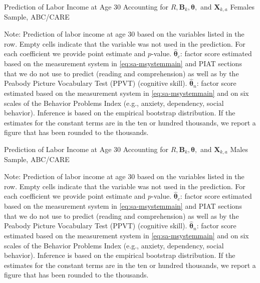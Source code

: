 \begin{table}
\begin{threeparttable}
\caption{Prediction of Labor Income at Age 30 Accounting for $R, \bm{B}_k, \bm{\theta},$ and $\bm{X}_{k,a}$ Females Sample, ABC/CARE}
\label{table:end2}
\centering
\scriptsize

\begin{tablenotes}
\footnotesize
\item Note: Prediction of labor income at age 30 based on the variables listed in the row. Empty cells indicate that the variable was not used in the prediction. For each coefficient we provide point estimate and $p$-value. $\hat{\bm{\theta}}_{c}$: factor score estimated based on the measurement system in \eqref{eq:sa-msystemmain} and PIAT sections that we do not use to predict (reading and comprehension) as well as by the Peabody Picture Vocabulary Test (PPVT) (cognitive skill). $\hat{\bm{\theta}}_{n}$: factor score estimated based on the measurement system in \eqref{eq:sa-msystemmain} and on six scales of the Behavior Problems Index (e.g., anxiety, dependency, social behavior). Inference is based on the empirical bootstrap distribution. If the estimates for the constant terms are in the ten or hundred thousands, we report a figure that has been rounded to the thousands.
\end{tablenotes}
\end{threeparttable}
\end{table}

\begin{table}
\begin{threeparttable}
\caption{Prediction of Labor Income at Age 30 Accounting for $R, \bm{B}_k, \bm{\theta},$ and $\bm{X}_{k,a}$ Males Sample, ABC/CARE}
\label{table:end2}
\centering
\scriptsize

\begin{tablenotes}
\footnotesize
\item Note: Prediction of labor income at age 30 based on the variables listed in the row. Empty cells indicate that the variable was not used in the prediction. For each coefficient we provide point estimate and $p$-value. $\hat{\bm{\theta}}_{c}$: factor score estimated based on the measurement system in \eqref{eq:sa-msystemmain} and PIAT sections that we do not use to predict (reading and comprehension) as well as by the Peabody Picture Vocabulary Test (PPVT) (cognitive skill). $\hat{\bm{\theta}}_{n}$: factor score estimated based on the measurement system in \eqref{eq:sa-msystemmain} and on six scales of the Behavior Problems Index (e.g., anxiety, dependency, social behavior). Inference is based on the empirical bootstrap distribution. If the estimates for the constant terms are in the ten or hundred thousands, we report a figure that has been rounded to the thousands.
\end{tablenotes}
\end{threeparttable}
\end{table}

